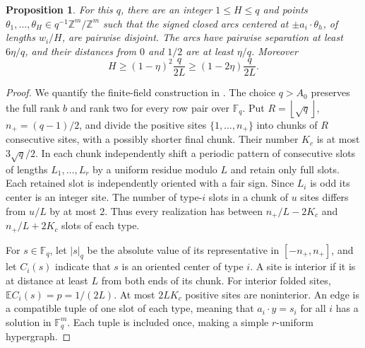 \documentclass[11pt]{article}
\newtheorem{proposition}[theorem]{Proposition}
\theoremstyle{remark}
\newcommand{\Z}{\mathbb Z}
\newcommand{\E}{\mathbb E}
\newcommand{\floor}[1]{\left\lfloor #1\right\rfloor}
\begin{document}
\begin{proposition}\label{prop:packing}
For this $q$, there are an integer $1\le H\le q$ and points
$\theta_1,\ldots,\theta_H\in q^{-1}\Z^m/\Z^m$ such that the signed
closed arcs centered at $\pm a_i\cdot\theta_h$, of lengths $w_i/H$,
are pairwise disjoint. The arcs have pairwise separation at least
$6\eta/q$, and their distances from $0$ and $1/2$ are at least $\eta/q$.
Moreover
\[
 H\ge(1-\eta)^2\frac q{2L}\ge(1-2\eta)\frac q{2L}.
\]
\end{proposition}

\begin{proof}
We quantify the finite-field construction in
\cite[Section 3]{predecessor}. The choice $q>A_0$ preserves the full rank
$b$ and rank two for every row pair over $\mathbb F_q$.
Put $R=\floor{\sqrt q}$, $n_+=(q-1)/2$, and divide the positive sites
$\{1,\ldots,n_+\}$ into chunks of $R$ consecutive sites, with a possibly
shorter final chunk. Their number $K_c$ is at most $3\sqrt q/2$.
In each chunk independently shift a periodic pattern of consecutive slots
of lengths $L_1,\ldots,L_r$ by a uniform residue modulo $L$ and retain
only full slots. Each retained slot is independently oriented with a fair
sign. Since $L_i$ is odd its center is an integer site.
The number of type-$i$ slots in a chunk of $u$ sites differs from $u/L$
by at most $2$. Thus every realization has between
$n_+/L-2K_c$ and $n_+/L+2K_c$ slots of each type.

For $s\in\mathbb F_q$, let $|s|_q$ be the absolute value of its
representative in $[-n_+,n_+]$, and let $C_i(s)$ indicate that $s$ is an
oriented center of type $i$. A site is interior if it is at distance at
least $L$ from both ends of its chunk. For interior folded sites,
$\E C_i(s)=p=1/(2L)$. At most $2LK_c$ positive sites are noninterior.
An edge is a compatible tuple of one slot of each type, meaning that
$a_i\cdot y=s_i$ for all $i$ has a solution in $\mathbb F_q^m$.
Each tuple is included once, making a simple $r$-uniform hypergraph.


\end{proof}
\end{document}
